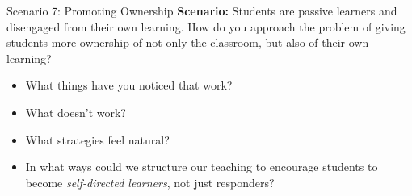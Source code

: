 \documentclass[dvipsnames]{beamer}
\begin{document}

\begin{frame}{Scenario 7: Promoting Ownership}
\textbf{Scenario:} Students are passive learners and disengaged from their own learning. How do you approach the problem of giving students more ownership of not only the classroom, but also of their own learning?
\begin{itemize}
    \item What things have you noticed that work?
    \item What doesn’t work?
    \item What strategies feel natural?
    \item In what ways could we structure our teaching to encourage students to become \emph{self-directed learners}, not just responders?
\end{itemize}
\end{frame}

\end{document}
